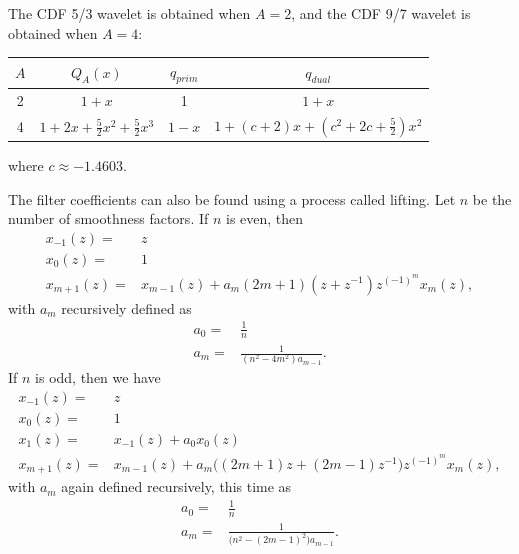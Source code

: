 \documentclass[titlepage,12pt]{article}
\begin{document}
The CDF 5/3 wavelet is obtained when $A=2$, 
and the CDF 9/7 wavelet is obtained when $A=4$:
\begin{table}[H]
    \centering
    \begin{tabular}{|c|c|c|c|}
        \hline
        $A$ & $Q_A(x)$ & $q_{prim}$ & $q_{dual}$ \\
        \hline
        2 & $1+x$ & 1 & $1+x$ \\
        \hline
        4 & $1+2x+\frac{5}{2}x^2+\frac{5}{2}x^3$ & $1-x$ & $1+(c+2)x+(c^2+2c+\frac{5}{2})x^2$ \\
        \hline
    \end{tabular}
\end{table}
where $c\approx-1.4603$.\cite{cdfwiki}

The filter coefficients can also be found using a process called lifting.\cite{lifting}
Let $n$ be the number of smoothness factors.
If $n$ is even, then
\begin{equation}
    \begin{aligned}
        x_{-1}(z) =& z \\
        x_0(z) =& 1 \\
        x_{m+1}(z) =& x_{m-1}(z)+a_m(2m+1)(z+z^{-1})z^{(-1)^m}x_m(z),
    \end{aligned}
\end{equation}
with $a_m$ recursively defined as
\begin{align*}
    a_0 =& \frac{1}{n} \\
    a_m =& \frac{1}{(n^2-4m^2)a_{m-1}}.
\end{align*}
If $n$ is odd, then we have
\begin{equation}
    \begin{aligned}
        x_{-1}(z) =& z \\
        x_0(z) =& 1 \\
        x_1(z) =& x_{-1}(z)+a_0x_0(z) \\
        x_{m+1}(z) =& x_{m-1}(z)+a_m\big((2m+1)z+(2m-1)z^{-1}\big)z^{(-1)^m}x_m(z),
    \end{aligned}
\end{equation}
with $a_m$ again defined recursively, this time as
\begin{align*}
    a_0 =& \frac{1}{n} \\
    a_m =& \frac{1}{\big(n^2-(2m-1)^2\big)a_{m-1}}.
\end{align*}

\end{document}
